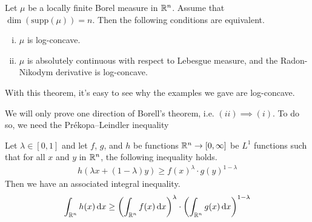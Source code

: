 \documentclass[11pt]{article}
\begin{document}
\begin{theorem}[Borell]
  Let $\mu$ be a locally finite Borel measure in $\mathbb{R}^n$. Assume that $\dim(\mathrm{supp}(\mu)) = n$.
  Then the following conditions are equivalent.
  \begin{enumerate}[(i)]
  \item $\mu$ is log-concave.
  \item $\mu$ is absolutely continuous with respect to Lebesgue measure, and the Radon-Nikodym derivative is log-concave.
  \end{enumerate}
\end{theorem}
With this theorem, it's easy to see why the examples we gave are log-concave.

We will only prove one direction of Borell's theorem, i.e. $(ii) \implies (i)$.
To do so, we need the Prékopa–Leindler inequality
\begin{theorem}
  Let $\lambda \in [0,1]$ and let $f$, $g$, and $h$ be functions $\mathbb{R}^n \to [0, \infty]$ be $L^1$ functions such that for all $x$ and $y$ in $\mathbb{R}^n$, the following inequality holds.
  \begin{align*}
    h(\lambda x + (1-\lambda)y) \geq f(x)^{\lambda} \cdot g(y)^{1-\lambda}
  \end{align*}
  Then we have an associated integral inequality.
  \begin{align*}
    \int_{\mathbb{R}^n} h(x) \mathrm{\,d} x \geq \left( \int_{\mathbb{R}^n} f(x) \mathrm{\,d} x \right)^{\lambda} \cdot \left( \int_{\mathbb{R}^n} g(x) \mathrm{\,d} x \right)^{1 - \lambda}
  \end{align*}
\end{theorem}
\end{document}

